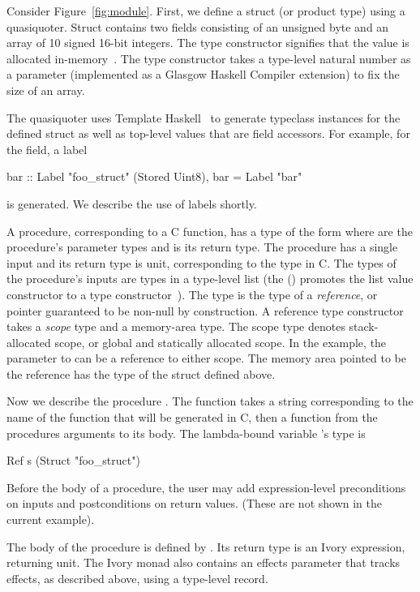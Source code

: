 Consider Figure~\ref{fig:module}.  First, we define a struct (or product type)
using a quasiquoter.  Struct  contains two fields
consisting of an unsigned byte and an array of 10 signed 16-bit integers.  The
 type constructor signifies that the value is allocated
in-memory~\cite{memareas}.  The  type constructor takes a type-level
natural number as a parameter (implemented as a Glasgow Haskell Compiler
extension) to fix the size of an array.

The quasiquoter uses Template Haskell~\cite{th} to generate
typeclass instances for the defined struct as well as top-level values that are
field accessors.  For example, for the  field, a label
\begin{code}
bar :: Label "foo\_struct" (Stored Uint8),
bar = Label "bar"
\end{code}
\noindent
is generated.  We describe the use of labels shortly.

A procedure, corresponding to a C function, has a type of the form
where  are the procedure's parameter types and  is its return
type.  The procedure  has a single input and its return type is
unit, corresponding to the  type in C.  The types of the procedure's
inputs are types in a type-level list (the () promotes the list value
constructor to a type constructor~\cite{datakinds}).  The type
is the type of a \emph{reference}, or pointer guaranteed to be non-null by
construction.  A reference type constructor takes a \emph{scope} type and a
memory-area type.  The scope type denotes stack-allocated scope, or global and
statically allocated scope.  In the example, the parameter to  can
be a reference to either scope.  The memory area pointed to be the reference
has the type of the struct defined above.

Now we describe the procedure .  The function  takes a
string corresponding to the name of the function that will be generated in C,
then a function from the procedures arguments to its body.  The lambda-bound
variable 's type is
\begin{code}
Ref s (Struct "foo\_struct")
\end{code}
\noindent
Before the body of a procedure, the user may add expression-level preconditions
on inputs and postconditions on return values. (These are not shown in the
current example).

The body of the procedure is defined by .  Its return type is an Ivory
expression, returning unit.  The Ivory monad also contains an effects parameter
that tracks effects, as described above, using a type-level record.


